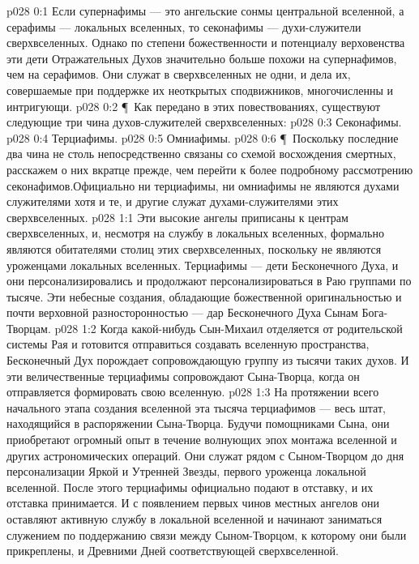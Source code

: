 \vs p028 0:1 Если супернафимы --- это ангельские сонмы центральной вселенной, а серафимы --- локальных вселенных, то секонафимы --- духи\hyp{}служители сверхвселенных. Однако по степени божественности и потенциалу верховенства эти дети Отражательных Духов значительно больше похожи на супернафимов, чем на серафимов. Они служат в сверхвселенных не одни, и дела их, совершаемые при поддержке их неоткрытых сподвижников, многочисленны и интригующи.
\vs p028 0:2 \P\ Как передано в этих повествованиях, существуют следующие три чина духов\hyp{}служителей сверхвселенных:
\vs p028 0:3 \bibnobreakspace Секонафимы.
\vs p028 0:4 \bibnobreakspace Терциафимы.
\vs p028 0:5 \bibnobreakspace Омниафимы.
\vs p028 0:6 \P\ Поскольку последние два чина не столь непосредственно связаны со схемой восхождения смертных, расскажем о них вкратце прежде, чем перейти к более подробному рассмотрению секонафимов.Официально ни терциафимы, ни омниафимы не являются духами служителями  хотя и те, и другие служат духами\hyp{}служителями  этих сверхвселенных.
\vs p028 1:1 Эти высокие ангелы приписаны к центрам сверхвселенных, и, несмотря на службу в локальных вселенных, формально являются обитателями столиц этих сверхвселенных, поскольку не являются уроженцами локальных вселенных. Терциафимы --- дети Бесконечного Духа, и они персонализировались и продолжают персонализироваться в Раю группами по тысяче. Эти небесные создания, обладающие божественной оригинальностью и почти верховной разносторонностью --- дар Бесконечного Духа Сынам Бога\hyp{}Творцам.
\vs p028 1:2 Когда какой\hyp{}нибудь Сын\hyp{}Михаил отделяется от родительской системы Рая и готовится отправиться создавать вселенную пространства, Бесконечный Дух порождает сопровождающую группу из тысячи таких духов. И эти величественные терциафимы сопровождают Сына\hyp{}Творца, когда он отправляется формировать свою вселенную.
\vs p028 1:3 На протяжении всего начального этапа создания вселенной эта тысяча терциафимов --- весь штат, находящийся в распоряжении Сына\hyp{}Творца. Будучи помощниками Сына, они приобретают огромный опыт в течение волнующих эпох монтажа вселенной и других астрономических операций. Они служат рядом с Сыном\hyp{}Творцом до дня персонализации Яркой и Утренней Звезды, первого уроженца локальной вселенной. После этого терциафимы официально подают в отставку, и их отставка принимается. И с появлением первых чинов местных ангелов они оставляют активную службу в локальной вселенной и начинают заниматься служением по поддержанию связи между Сыном\hyp{}Творцом, к которому они были прикреплены, и Древними Дней соответствующей сверхвселенной.

